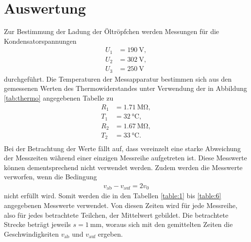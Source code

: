 \section{Auswertung}
\label{sec:Auswertung}

Zur Bestimmung der Ladung der Öltröpfchen werden Messungen für die Kondensatorspannungen
\begin{align*}
U_1 &= \SI{190}{\volt},\\
U_2 &= \SI{302}{\volt},\\
U_3 &= \SI{250}{\volt}
\end{align*}
durchgeführt.
Die Temperaturen der Messapparatur bestimmen sich aus den gemessenen Werten des Thermowiderstandes unter Verwendung der in Abbildung \ref{tab:thermo} angegebenen Tabelle zu
\begin{align*}
R_1 &= \SI{1.71}{\mega\ohm},\\
T_1 &= \SI{32}{\celsius},\\
R_2 &= \SI{1.67}{\mega\ohm},\\
T_2 &= \SI{33}{\celsius}.\\
\end{align*}
Bei der Betrachtung der Werte fällt auf, dass vereinzelt eine starke Abweichung der Messzeiten während einer einzigen Messreihe aufgetreten ist.
Diese Messwerte können dementsprechend nicht verwendet werden.
Zudem werden die Messwerte verworfen, wenn die Bedingung
\begin{align*}
  v_{\text{ab}} - v_{\text{auf}} = 2 v_0
\end{align*}
nicht erfüllt wird.
Somit werden die in den Tabellen \ref{table:1} bis \ref{table:6} angegebenen Messwerte verwendet.
Von diesen Zeiten wird für jede Messreihe, also für jedes betrachtete Teilchen, der Mittelwert gebildet.
Die betrachtete Strecke beträgt jeweils $s = \SI{1}{\milli\metre}$, woraus sich mit den gemittelten Zeiten die Geschwindigkeiten $v_{\text{ab}}$ und $v_{\text{auf}}$ ergeben.












\clearpage


